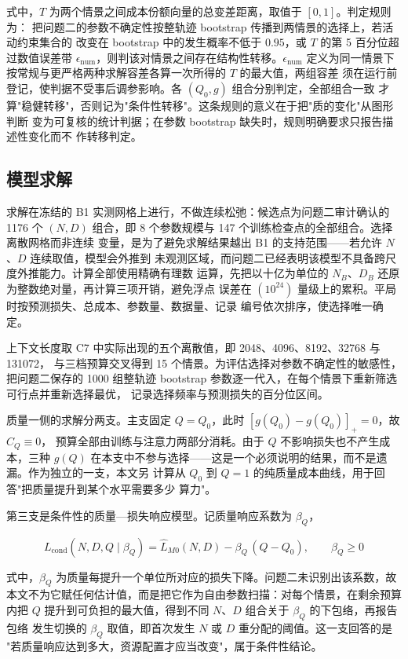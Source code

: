 \documentclass[bwprint]{gmcmthesis}
\numberwithin{equation}{section}
\numberwithin{figure}{section}
\numberwithin{table}{section}
\begin{document}
式中，$T$ 为两个情景之间成本份额向量的总变差距离，取值于 $[0,1]$。判定规则为：
把问题二的参数不确定性按整轨迹 bootstrap 传播到两情景的选择上，若活动约束集合的
改变在 bootstrap 中的发生概率不低于 $0.95$，或 $T$ 的第 5 百分位超过数值误差带
$\epsilon_{\mathrm{num}}$，则判该对情景之间存在结构性转移。$\epsilon_{\mathrm{num}}$
定义为同一情景下按常规与更严格两种求解容差各算一次所得的 $T$ 的最大值，两组容差
须在运行前登记，使判据不受事后调参影响。各 $(Q_0,g)$ 组合分别判定，全部组合一致
才算"稳健转移"，否则记为"条件性转移"。这条规则的意义在于把"质的变化"从图形判断
变为可复核的统计判据；在参数 bootstrap 缺失时，规则明确要求只报告描述性变化而不
作转移判定。

\subsection{模型求解}

求解在冻结的 B1 实测网格上进行，不做连续松弛：候选点为问题二审计确认的 1176 个
$(N,D)$ 组合，即 8 个参数规模与 147 个训练检查点的全部组合。选择离散网格而非连续
变量，是为了避免求解结果越出 B1 的支持范围——若允许 $N$、$D$ 连续取值，模型会外推到
未观测区域，而问题二已经表明该模型不具备跨尺度外推能力。计算全部使用精确有理数
运算，先把以十亿为单位的 $N_B$、$D_B$ 还原为整数绝对量，再计算三项开销，避免浮点
误差在 $(10^{24})$ 量级上的累积。平局时按预测损失、总成本、参数量、数据量、记录
编号依次排序，使选择唯一确定。

上下文长度取 C7 中实际出现的五个离散值，即 2048、4096、8192、32768 与 131072，
与三档预算交叉得到 15 个情景。为评估选择对参数不确定性的敏感性，把问题二保存的
1000 组整轨迹 bootstrap 参数逐一代入，在每个情景下重新筛选可行点并重新选择最优，
记录选择频率与预测损失的百分位区间。

质量一侧的求解分两支。主支固定 $Q=Q_0$，此时 $[g(Q_0)-g(Q_0)]_+=0$，故 $C_Q\equiv0$，
预算全部由训练与注意力两部分消耗。由于 $Q$ 不影响损失也不产生成本，三种 $g(Q)$
在本支中不参与选择——这是一个必须说明的结果，而不是遗漏。作为独立的一支，本文另
计算从 $Q_0$ 到 $Q=1$ 的纯质量成本曲线，用于回答"把质量提升到某个水平需要多少
算力"。

第三支是条件性的质量—损失响应模型。记质量响应系数为 $\beta_Q$，

\begin{equation}
L_{\mathrm{cond}}(N,D,Q\mid\beta_Q)=\hat L_{M0}(N,D)-\beta_Q\,(Q-Q_0),\qquad \beta_Q\ge0
\end{equation}

式中，$\beta_Q$ 为质量每提升一个单位所对应的损失下降。问题二未识别出该系数，故
本文不为它赋任何估计值，而是把它作为自由参数扫描：对每个情景，在剩余预算内把 $Q$
提升到可负担的最大值，得到不同 $N$、$D$ 组合关于 $\beta_Q$ 的下包络，再报告包络
发生切换的 $\beta_Q$ 取值，即首次发生 $N$ 或 $D$ 重分配的阈值。这一支回答的是
"若质量响应达到多大，资源配置才应当改变"，属于条件性结论。
\end{document}
